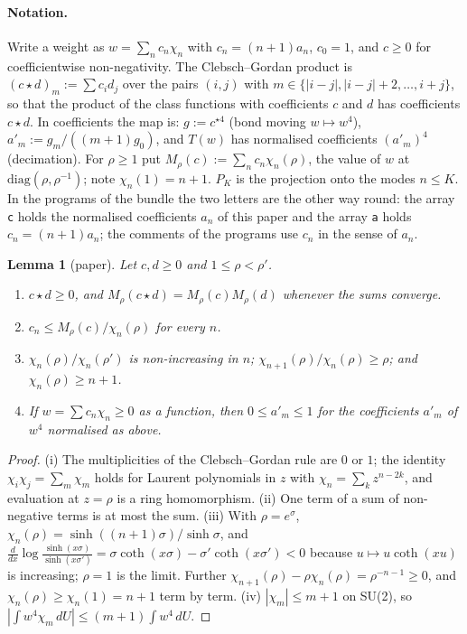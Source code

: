 \documentclass[11pt,a4paper]{article}
\newtheorem{lemma}[theorem]{Lemma}
\theoremstyle{definition}
\theoremstyle{remark}
\newcommand{\code}[1]{\texttt{#1}}
\begin{document}
\paragraph{Notation.}
Write a weight as $w=\sum_nc_n\chi_n$ with $c_n=(n+1)a_n$, $c_0=1$, and $c\ge0$ for coefficientwise non-negativity.
The Clebsch--Gordan product is $(c\star d)_m:=\sum c_id_j$ over the pairs $(i,j)$ with $m\in\{|i-j|,|i-j|+2,\dots,i+j\}$, so that the product of the class functions with coefficients $c$ and $d$ has coefficients $c\star d$.
In coefficients the map is: $g:=c^{\star4}$ (bond moving $w\mapsto w^4$), $a'_m:=g_m/((m+1)g_0)$, and $T(w)$ has normalised coefficients $(a'_m)^4$ (decimation).
For $\rho\ge1$ put $M_\rho(c):=\sum_nc_n\chi_n(\rho)$, the value of $w$ at $\mathrm{diag}(\rho,\rho^{-1})$; note $\chi_n(1)=n+1$.
$P_K$ is the projection onto the modes $n\le K$.
In the programs of the bundle the two letters are the other way round: the array \code{c} holds the normalised coefficients $a_n$ of this paper and the array \code{a} holds $c_n=(n+1)a_n$; the comments of the programs use $c_n$ in the sense of $a_n$.

\begin{lemma}[paper]\label{lem:cg}
Let $c,d\ge0$ and $1\le\rho<\rho'$.
\begin{enumerate}[label=(\roman*),nosep]
\item $c\star d\ge0$, and $M_\rho(c\star d)=M_\rho(c)M_\rho(d)$ whenever the sums converge.
\item $c_n\le M_\rho(c)/\chi_n(\rho)$ for every $n$.
\item $\chi_n(\rho)/\chi_n(\rho')$ is non-increasing in $n$; $\chi_{n+1}(\rho)/\chi_n(\rho)\ge\rho$; and $\chi_n(\rho)\ge n+1$.
\item If $w=\sum c_n\chi_n\ge0$ as a function, then $0\le a'_m\le1$ for the coefficients $a'_m$ of $w^4$ normalised as above.
\end{enumerate}
\end{lemma}
\begin{proof}
(i) The multiplicities of the Clebsch--Gordan rule are $0$ or $1$; the identity $\chi_i\chi_j=\sum_{m}\chi_m$ holds for Laurent polynomials in $z$ with $\chi_n=\sum_kz^{n-2k}$, and evaluation at $z=\rho$ is a ring homomorphism.
(ii) One term of a sum of non-negative terms is at most the sum.
(iii) With $\rho=e^{\sigma}$, $\chi_n(\rho)=\sinh((n+1)\sigma)/\sinh\sigma$, and $\frac{d}{dx}\log\frac{\sinh(x\sigma)}{\sinh(x\sigma')}=\sigma\coth(x\sigma)-\sigma'\coth(x\sigma')<0$ because $u\mapsto u\coth(xu)$ is increasing; $\rho=1$ is the limit.
Further $\chi_{n+1}(\rho)-\rho\chi_n(\rho)=\rho^{-n-1}\ge0$, and $\chi_n(\rho)\ge\chi_n(1)=n+1$ term by term.
(iv) $|\chi_m|\le m+1$ on SU(2), so $|\int w^4\chi_m\,dU|\le(m+1)\int w^4\,dU$.
\end{proof}
\end{document}
